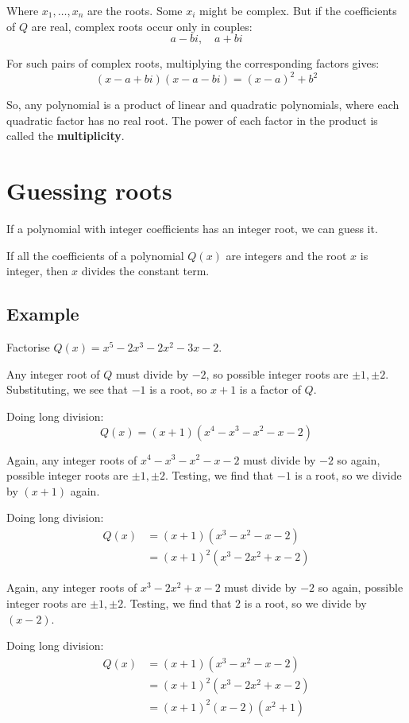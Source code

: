 \documentclass[11pt]{article}
\begin{document}
Where \(x_1, \ldots, x_n\) are the roots. Some \(x_i\) might be complex. But if the coefficients of \(Q\) are real, complex roots occur only in couples:
\[a - bi, \quad a + bi\]

For such pairs of complex roots, multiplying the corresponding factors gives:
\[(x - a + bi)(x - a - bi) = (x - a)^2 + b^2\]

So, any polynomial is a product of linear and quadratic polynomials, where each quadratic factor has no real root. The power of each factor in the product is called the \textbf{multiplicity}.
\section{Guessing roots}
\label{sec:org3ebd62e}
If a polynomial with integer coefficients has an integer root, we can guess it.


If all the coefficients of a polynomial \(Q(x)\) are integers and the root \(x\) is integer, then \(x\) divides the constant term.
\subsection{Example}
\label{sec:org7ebfb76}
Factorise \(Q(x) = x^5 - 2x^3 - 2x^2 - 3x - 2\).


Any integer root of \(Q\) must divide by \(-2\), so possible integer roots are \(\pm 1, \pm 2\). Substituting, we see that \(-1\) is a root, so \(x + 1\) is a factor of \(Q\).


Doing long division:
\[Q(x) = (x + 1)(x^4 - x^3 - x^2 - x - 2)\]

Again, any integer roots of \(x^4 - x^3 - x^2 - x - 2\) must divide by \(-2\) so again, possible integer roots are \(\pm 1, \pm 2\). Testing, we find that \(-1\) is a root, so we divide by \((x + 1)\) again.


Doing long division:
\begin{align*}
Q(x) &= (x + 1)(x^3 - x^2 - x - 2) \\
&= (x + 1)^2 (x^3 - 2x^2 + x - 2)
\end{align*}

Again, any integer roots of \(x^3 - 2x^2 + x - 2\) must divide by \(-2\) so again, possible integer roots are \(\pm 1, \pm 2\). Testing, we find that \(2\) is a root, so we divide by \((x - 2)\).


Doing long division:
\begin{align*}
Q(x) &= (x + 1)(x^3 - x^2 - x - 2) \\
&= (x + 1)^2 (x^3 - 2x^2 + x - 2) \\
&= (x + 1)^2 (x - 2) (x^2 + 1)
\end{align*}
\end{document}
